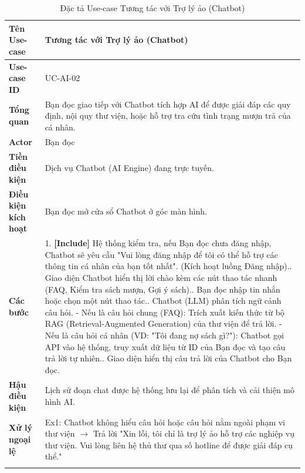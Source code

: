 \newpage
\begin{longtable}{|p{3.5cm}|p{11.5cm}|}
    \hline
    \textbf{Tên Use-case} & \textbf{Tương tác với Trợ lý ảo (Chatbot)} \\
    \hline
    \textbf{Use-case ID} & UC-AI-02 \\
    \hline
    \textbf{Tổng quan} & Bạn đọc giao tiếp với Chatbot tích hợp AI để được giải đáp các quy định, nội quy thư viện, hoặc hỗ trợ tra cứu tình trạng mượn trả của cá nhân. \\
    \hline
    \textbf{Actor} & Bạn đọc \\
    \hline
    \textbf{Tiền điều kiện} & Dịch vụ Chatbot (AI Engine) đang trực tuyến. \\
    \hline
    \textbf{Điều kiện kích hoạt} & Bạn đọc mở cửa sổ Chatbot ở góc màn hình. \\
    \hline
    \textbf{Các bước} & 
    1. \textbf{[Include]} Hệ thống kiểm tra, nếu Bạn đọc chưa đăng nhập, Chatbot sẽ yêu cầu "Vui lòng đăng nhập để tôi có thể hỗ trợ các thông tin cá nhân của bạn tốt nhất". (Kích hoạt luồng Đăng nhập).\newline
    2. Giao diện Chatbot hiển thị lời chào kèm các nút thao tác nhanh (FAQ, Kiểm tra sách mượn, Gợi ý sách).\newline
    3. Bạn đọc nhập tin nhắn hoặc chọn một nút thao tác.\newline
    4. Chatbot (LLM) phân tích ngữ cảnh câu hỏi.\newline
    - Nếu là câu hỏi chung (FAQ): Trích xuất kiến thức từ bộ RAG (Retrieval-Augmented Generation) của thư viện để trả lời.\newline
    - Nếu là câu hỏi cá nhân (VD: "Tôi đang nợ sách gì?"): Chatbot gọi API vào hệ thống, truy xuất dữ liệu từ ID của Bạn đọc và tạo câu trả lời tự nhiên.\newline
    5. Giao diện hiển thị câu trả lời của Chatbot cho Bạn đọc. \\
    \hline
    \textbf{Hậu điều kiện} & Lịch sử đoạn chat được hệ thống lưu lại để phân tích và cải thiện mô hình AI. \\
    \hline
    \textbf{Xử lý ngoại lệ} & 
    Ex1: Chatbot không hiểu câu hỏi hoặc câu hỏi nằm ngoài phạm vi thư viện $\rightarrow$ Trả lời "Xin lỗi, tôi chỉ là trợ lý ảo hỗ trợ các nghiệp vụ thư viện. Vui lòng liên hệ thủ thư qua số hotline để được giải đáp cụ thể." \\
    \hline
    \caption{Đặc tả Use-case Tương tác với Trợ lý ảo (Chatbot)}
\end{longtable}


